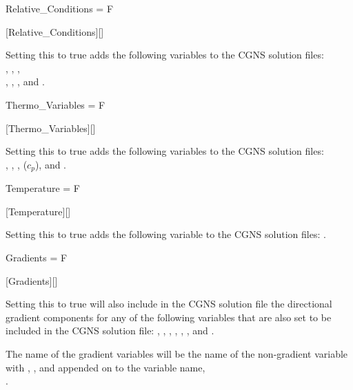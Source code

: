 
\begin{nmldescitem}
Relative_Conditions = F
\end{nmldescitem}
[Relative\_Conditions][]

\begin{nmldescbody}
Setting this to true adds the following variables to the CGNS solution files:
\\
  ,
  ,
  ,
\\
  ,
  ,
  , and
  .
\end{nmldescbody}


\begin{nmldescitem}
Thermo_Variables = F
\end{nmldescitem}
[Thermo\_Variables][]

\begin{nmldescbody}
Setting this to true adds the following variables to the CGNS solution files:
\\
  ,
  ,
  ,
   (\thatis $c_p$), and
  .
\end{nmldescbody}


\begin{nmldescitem}
Temperature = F
\end{nmldescitem}
[Temperature][]

\begin{nmldescbody}
Setting this to true adds the following variable to the CGNS solution files:
  .
\end{nmldescbody}


\begin{nmldescitem}
Gradients = F
\end{nmldescitem}
[Gradients][]

\begin{nmldescbody}
Setting this to true will also include in the CGNS solution file the
directional gradient components for any of the following variables that are
also set to be included in the CGNS solution file:
  ,
  ,
  ,
  ,
  ,
  , and
  .

The name of the gradient variables will be the name of the
non-gradient variable with
  , , and 
appended on to the variable name,
\forexample
\\
  .
\end{nmldescbody}


